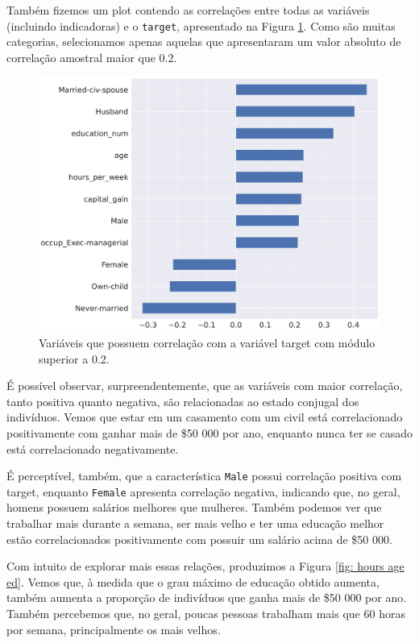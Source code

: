 \documentclass[a4paper, 12pt]{article}
\begin{document}
Também fizemos um plot contendo as correlações entre todas as variáveis (incluindo indicadoras) e o \verb|target|, apresentado na Figura \ref{fig: corr target}.
Como são muitas categorias, selecionamos apenas aquelas que apresentaram um valor absoluto de correlação amostral maior que \( 0.2 \).
\begin{figure}[htb]
    \begin{center}
        \includegraphics[width=.7\textwidth]{corr_with_target.pdf}
    \end{center}
    \caption{Variáveis que possuem correlação com a variável target com módulo superior a 0.2.}
    \label{fig: corr target}
\end{figure}
É possível observar, surpreendentemente, que as variáveis com maior correlação, tanto positiva quanto negativa, são relacionadas ao estado conjugal dos indivíduos.
Vemos que estar em um casamento com um civil está correlacionado positivamente com ganhar mais de \$50 000 por ano, enquanto nunca ter se casado está correlacionado negativamente.

É perceptível, também, que a característica \verb|Male| possui correlação positiva com target, enquanto \verb|Female| apresenta correlação negativa, indicando que, no geral, homens possuem salários melhores que mulheres.
Também podemos ver que trabalhar mais durante a semana, ser mais velho e ter uma educação melhor estão correlacionados positivamente com possuir um salário acima de \$50 000.

Com intuito de explorar mais essas relações, produzimos a Figura \ref{fig: hours age ed}.
Vemos que, à medida que o grau máximo de educação obtido aumenta, também aumenta a proporção de indivíduos que ganha mais de \$50 000 por ano.
Também percebemos que, no geral, poucas pessoas trabalham mais que 60 horas por semana, principalmente os mais velhos.
\end{document}
